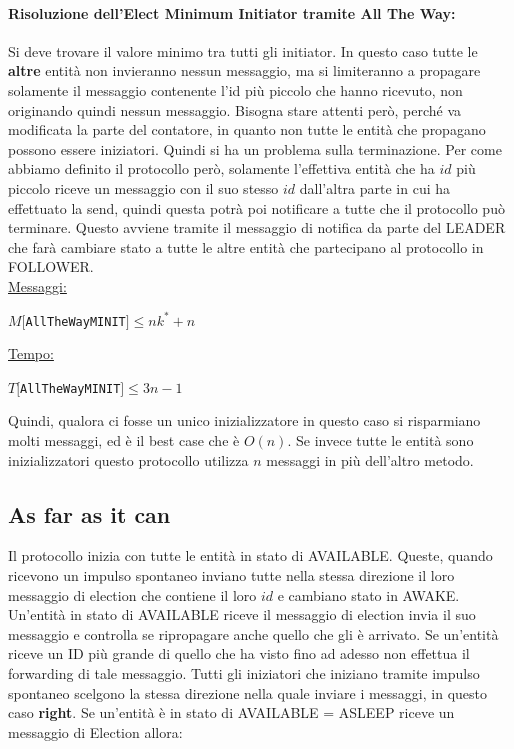 \paragraph{Risoluzione dell'Elect Minimum Initiator tramite All The Way:} Si deve
trovare il valore minimo tra tutti gli initiator. In questo caso tutte le
\textbf{altre} entità non invieranno nessun messaggio, ma si limiteranno a
propagare solamente il messaggio contenente l'id più piccolo che hanno ricevuto,
non originando quindi nessun messaggio. Bisogna stare attenti però, perché va
modificata la parte del contatore, in quanto non tutte le entità che propagano
possono essere iniziatori. Quindi si ha un problema sulla terminazione. Per come
abbiamo definito il protocollo però, solamente l'effettiva entità che ha $id$
più piccolo riceve un messaggio con il suo stesso $id$ dall'altra parte in cui
ha effettuato la send, quindi questa potrà poi notificare a tutte che il
protocollo può terminare. Questo avviene tramite il messaggio di notifica da
parte del LEADER che farà cambiare stato a tutte le altre entità che partecipano
al protocollo in FOLLOWER.\\
\underline{Messaggi:}
\begin{center}
    $M[$\texttt{AllTheWayMINIT}$] \leq nk^* + n $
\end{center}
\underline{Tempo:}
\begin{center}
    $T[$\texttt{AllTheWayMINIT}$] \leq 3n - 1$
\end{center}
Quindi, qualora ci fosse un unico inizializzatore in questo caso si risparmiano
molti messaggi, ed è il best case che è $O(n)$. Se invece tutte le entità sono
inizializzatori questo protocollo utilizza $n$ messaggi in più dell'altro
metodo.

\subsection{As far as it can}\label{asfar}

Il protocollo inizia con tutte le
entità in stato di AVAILABLE. Queste, quando ricevono un impulso spontaneo
inviano tutte nella stessa direzione il loro messaggio di election che contiene
il loro $id$ e cambiano stato in AWAKE. Un'entità in stato di AVAILABLE riceve il
messaggio di election invia il suo messaggio e controlla se ripropagare anche
quello che gli è arrivato. Se un'entità riceve un ID più grande di quello che ha
visto fino ad adesso non effettua il forwarding di tale messaggio. Tutti gli
iniziatori che iniziano tramite impulso spontaneo scelgono la stessa direzione
nella quale inviare i messaggi, in questo caso \textbf{right}. Se un'entità è in
stato di AVAILABLE = ASLEEP riceve un messaggio di Election allora:

